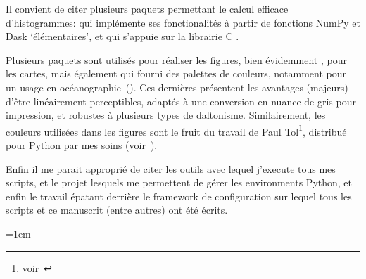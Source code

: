 Il convient de citer plusieurs paquets permettant le calcul efficace d'histogrammes:
 qui implémente ses fonctionalités à partir de fonctions NumPy et Dask \enquote*{élémentaires}, et
 qui s'appuie sur la librairie C .

Plusieurs paquets sont utilisés pour réaliser les figures, bien évidemment ,
 pour les cartes,
mais également  qui fourni des palettes de couleurs, notamment pour un usage en océanographie~(\cite{thyng_2016}). Ces dernières présentent les avantages (majeurs) d'être linéairement perceptibles, adaptés à une conversion en nuance de gris pour impression, et robustes à plusieurs types de daltonisme.
Similairement, les couleurs utilisées dans les figures sont le fruit du travail de Paul Tol\footnote{voir~}, distribué pour Python par mes soins (voir~).

Enfin il me parait approprié de citer les outils  avec lequel j'execute tous mes scripts,  et le projet  lesquels me permettent de gérer les environments Python, et enfin le travail épatant derrière le framework de configuration  sur lequel tous les scripts et ce manuscrit (entre autres) ont été écrits.

{
  \emergencystretch=1em
  \printbibliography[heading=none, type=software, notkeyword=personnal]
}

